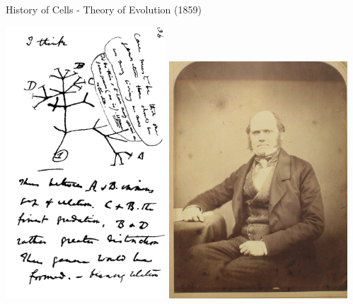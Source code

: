 \begin{frame}{History of Cells - Theory of Evolution (1859)}
\footnotesize
\begin{center}
\includegraphics[width=0.45\textwidth]{./images/Darwin_tree.png} 
\includegraphics[width=0.5\textwidth]{./images/darwin-1855_photo.jpg} 
\end{center}
\end{frame}

